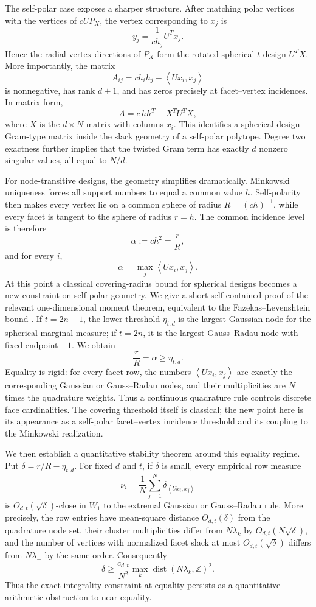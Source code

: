 \documentclass[11pt]{amsart}
\theoremstyle{definition}
\theoremstyle{remark}
\newcommand{\ip}[2]{\left\langle #1,#2\right\rangle}
\begin{document}
The self-polar case exposes a sharper structure.  After matching polar vertices with the vertices of $cUP_X$, the vertex corresponding to $x_j$ is
\[
 y_j=\frac{1}{c h_j}U^Tx_j.
\]
Hence the radial vertex directions of $P_X$ form the rotated spherical $t$-design $U^TX$.  More importantly, the matrix
\[
 A_{ij}=c h_i h_j-\ip{Ux_i}{x_j}
\]
is nonnegative, has rank $d+1$, and has zeros precisely at facet--vertex incidences.  In matrix form,
\[
 A=c\,hh^T-X^TU^TX,
\]
where $X$ is the $d\times N$ matrix with columns $x_i$.  This identifies a spherical-design Gram-type matrix inside the slack geometry of a self-polar polytope.  Degree two exactness further implies that the twisted Gram term has exactly $d$ nonzero singular values, all equal to $N/d$.

For node-transitive designs, the geometry simplifies dramatically.  Minkowski uniqueness forces all support numbers to equal a common value $h$.  Self-polarity then makes every vertex lie on a common sphere of radius $R=(ch)^{-1}$, while every facet is tangent to the sphere of radius $r=h$.  The common incidence level is therefore
\[
 \alpha:=ch^2=\frac rR,
\]
and for every $i$,
\[
 \alpha=\max_j\ip{Ux_i}{x_j}.
\]
At this point a classical covering-radius bound for spherical designs becomes a new constraint on self-polar geometry.  We give a short self-contained proof of the relevant one-dimensional moment theorem, equivalent to the Fazekas--Levenshtein bound \cite{FazekasLevenshtein1995}.  If $t=2n+1$, the lower threshold $\eta_{t,d}$ is the largest Gaussian node for the spherical marginal measure; if $t=2n$, it is the largest Gauss--Radau node with fixed endpoint $-1$.  We obtain
\[
 \boxed{\frac rR=\alpha\ge\eta_{t,d}.}
\]
Equality is rigid: for every facet row, the numbers $\ip{Ux_i}{x_j}$ are exactly the corresponding Gaussian or Gauss--Radau nodes, and their multiplicities are $N$ times the quadrature weights.  Thus a continuous quadrature rule controls discrete face cardinalities.  The covering threshold itself is classical; the new point here is its appearance as a self-polar facet--vertex incidence threshold and its coupling to the Minkowski realization.

We then establish a quantitative stability theorem around this equality regime.  Put $\delta=r/R-\eta_{t,d}$.  For fixed $d$ and $t$, if $\delta$ is small, every empirical row measure
\[
 \nu_i=\frac1N\sum_{j=1}^N\delta_{\ip{Ux_i}{x_j}}
\]
is $O_{d,t}(\sqrt\delta)$-close in $W_1$ to the extremal Gaussian or Gauss--Radau rule.  More precisely, the row entries have mean-square distance $O_{d,t}(\delta)$ from the quadrature node set, their cluster multiplicities differ from $N\lambda_k$ by $O_{d,t}(N\sqrt\delta)$, and the number of vertices with normalized facet slack at most $O_{d,t}(\sqrt\delta)$ differs from $N\lambda_+$ by the same order.  Consequently
\[
 \delta\ge \frac{c_{d,t}}{N^2}
 \max_k \operatorname{dist}(N\lambda_k,\mathbb Z)^2.
\]
Thus the exact integrality constraint at equality persists as a quantitative arithmetic obstruction to near equality.
\end{document}
